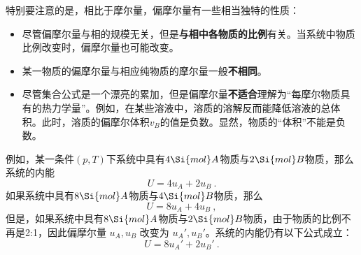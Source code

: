 特别要注意的是，相比于摩尔量，偏摩尔量有一些相当独特的性质：
\begin{itemize}
\item 尽管偏摩尔量与相的规模无关，但是\textbf{与相中各物质的比例}有关。当系统中物质比例改变时，偏摩尔量也可能改变。
\item 某一物质的偏摩尔量与相应纯物质的摩尔量一般\textbf{不相同}。
\item 尽管集合公式是一个漂亮的累加，但是偏摩尔量\textbf{不适合}理解为“每摩尔物质具有的热力学量”。例如，在某些溶液中，溶质的溶解反而能降低溶液的总体积。此时，溶质的偏摩尔体积$v_B$的值是负数。显然，物质的“体积”不能是负数。
\end{itemize}

\begin{example}{}
例如，某一条件$(p,T)$下系统中具有$4 \Si{mol} A$物质与$2 \Si{mol} B$物质，那么系统的内能
$$U = 4 u_{A} +  2 u_B~. $$
如果系统中具有$8 \Si{mol} A$物质与$4 \Si{mol} B$物质，那么
$$U = 8 u_A +  4 u_B~,$$
但是，如果系统中具有$8 \Si{mol} A$物质与$2 \Si{mol} B$物质，由于物质的比例不再是2:1，因此偏摩尔量 $u_A,u_B$ 改变为 $u_A',u_B'$。系统的内能仍有以下公式成立：
$$U = 8 u_A' +  2 u_B'~.$$
\end{example}

